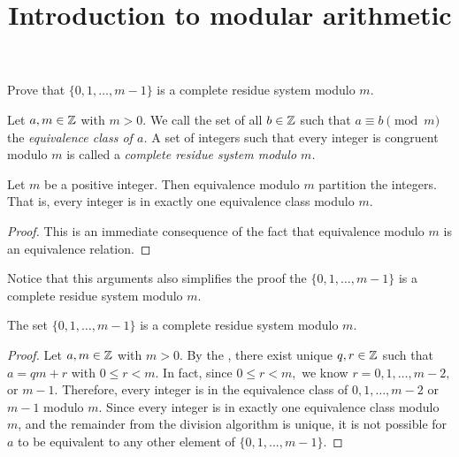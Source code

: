 \documentclass{ximera}
\title{Introduction to modular arithmetic}
\begin{document}
\begin{abstract}
\end{abstract}
\maketitle


\begin{obj}
 \item Prove that $\{0,1,\dots,m-1\}$ is a complete residue system modulo $m$.
\end{obj}


\begin{defn}\label{defn:complete-residue}
    Let $a,m\in\mathbb Z$ with $m>0$. We call the set of all $b\in\mathbb Z$ such that $a\equiv b \pmod{m}$ the \emph{equivalence class of $a$.} A set of integers such that every integer is congruent modulo $m$ is called a \emph{complete residue system modulo $m$.}
\end{defn}

\begin{proposition}\label{cor:mod-partition}
    Let $m$ be a positive integer. Then equivalence modulo $m$ partition the integers. That is, every integer is in exactly one equivalence class modulo $m$.

    \begin{proof}
        This is an immediate consequence of the fact that equivalence modulo $m$ is an equivalence relation.
    \end{proof}
\end{proposition}
 
Notice that this arguments also simplifies the proof the $\{0,1,\dots,m-1\}$ is a complete residue system modulo $m$.
\begin{proposition}\label{prop:complete-residue}
    The set $\{0,1,\dots,m-1\}$ is a complete residue system modulo $m$.

    \begin{proof}
        Let $a,m\in\mathbb Z$ with $m>0$. By the , there exist unique $q,r\in\mathbb Z$ such that $a=qm+r$ with $0\leq r <m$. In fact, since $0\leq r<m,$ we know $r=0,1,\dots, m-2,$ or $m-1$. Therefore, every integer is in the equivalence class of $0,1,\dots, m-2$ or $m-1$ modulo $m$.
        Since every integer is in exactly one equivalence class modulo $m$, and the remainder from the division algorithm is unique, it is not possible for $a$ to be equivalent to any other element of $\{0,1,\dots,m-1\}$. 
    \end{proof}
\end{proposition}
\end{document}
